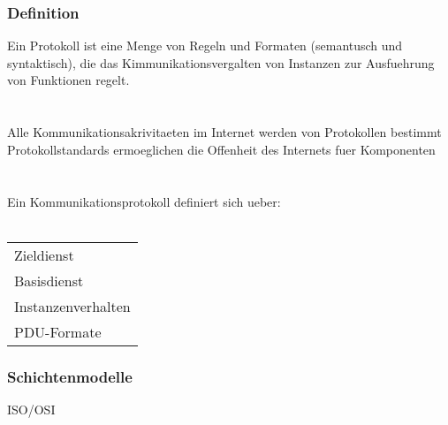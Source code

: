 \documentclass{article}
\newcommand{\gap}{\\ \ \\}
\begin{document}
\subsubsection{Definition}
Ein Protokoll ist eine Menge von Regeln und Formaten (semantusch und syntaktisch), die das Kimmunikationsvergalten von
Instanzen zur Ausfuehrung von Funktionen regelt.\\
\gap
Alle Kommunikationsakrivitaeten im Internet werden von Protokollen bestimmt\\
Protokollstandards ermoeglichen die Offenheit des Internets fuer Komponenten\\
\gap
Ein Kommunikationsprotokoll definiert sich ueber:\\
\\
\begin{tabular}{l}
    Zieldienst\\
    Basisdienst\\
    Instanzenverhalten\\
    PDU-Formate\\
\end{tabular}
\subsubsection{Schichtenmodelle}
\begin{textit}
    ISO/OSI\\
\end{textit}
\end{document}
